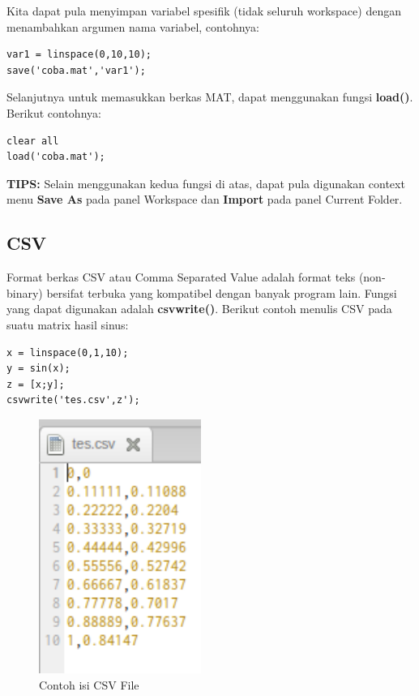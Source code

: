 \documentclass[12pt]{book}
\begin{document}
	Kita dapat pula menyimpan variabel spesifik (tidak seluruh workspace) dengan menambahkan argumen nama variabel,
	contohnya:

	\begin{verbatim}
var1 = linspace(0,10,10);
save('coba.mat','var1');
	\end{verbatim}

	Selanjutnya untuk memasukkan berkas MAT, dapat menggunakan fungsi \textbf{load()}.
	Berikut contohnya:
	\begin{verbatim}
clear all
load('coba.mat');
	\end{verbatim}

	\textbf{TIPS:} Selain menggunakan kedua fungsi di atas, dapat pula digunakan context menu \textbf{Save As} pada panel Workspace
	dan \textbf{Import} pada panel Current Folder.

	\subsection{CSV}

	Format berkas CSV atau Comma Separated Value adalah format teks (non-binary) bersifat terbuka yang kompatibel dengan banyak program lain.
	Fungsi yang dapat digunakan adalah \textbf{csvwrite()}.
	Berikut contoh menulis CSV pada suatu matrix hasil sinus:
	\begin{verbatim}
x = linspace(0,1,10);
y = sin(x);
z = [x;y];
csvwrite('tes.csv',z');
	\end{verbatim}

	\begin{figure}[!ht]
		\centering
		\includegraphics[width=150pt]{images/csvfile}
		\caption{Contoh isi CSV File}
	\end{figure}
\end{document}
